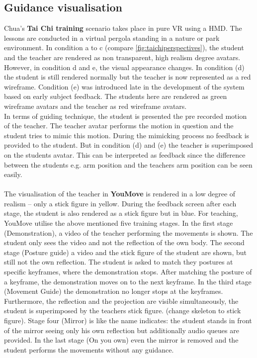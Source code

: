 \subsection{Guidance visualisation}
Chua's \textbf{Tai Chi training} scenario takes place in pure VR using a HMD. The lessons are conducted in a virtual pergola standing in a nature or park environment. In condition a to c (compare \ref{fig:taichiperspectives}), the student and the teacher are rendered as non transparent, high realism degree avatars. However, in condition d and e, the visual appearance changes. In condition (d) the student is still rendered normally but the teacher is now represented as a red wireframe. Condition (e) was introduced late in the development of the system based on early subject feedback. The students here are rendered as green wireframe avatars and the teacher as red wireframe avatars.\\
In terms of guiding technique, the student is presented the pre recorded motion of the teacher. The teacher avatar performs the motion in question and the student tries to mimic this motion. During the mimicking process no feedback is provided to the student. But in condition (d) and (e) the teacher is superimposed on the students avatar. This can be interpreted as feedback since the difference between the students e.g. arm position and the teachers arm position can be seen easily.\\ \\
The visualisation of the teacher in \textbf{YouMove} is rendered in a low degree of realism \--- only a stick figure in yellow. During the feedback screen after each stage, the student is also rendered as a stick figure but in blue. For teaching, YouMove utilise the above mentioned five training stages. In the first stage (Demonstration), a video of the teacher performing the movements is shown. The student only sees the video and not the reflection of the own body. The second stage (Posture guide) a video and the stick figure of the student are shown, but still not the own reflection. The student is asked to match they postures at specific keyframes, where the demonstration stops. After matching the posture of a keyframe, the demonstration moves on to the next keyframe. In the third stage (Movement Guide) the demonstration no longer stops at the keyframes. Furthermore, the reflection and the projection are visible simultaneously, the student is superimposed by the teachers stick figure. (\todo change skeleton to stick figure). Stage four (Mirror) is like the name indicates: the student stands in front of the mirror seeing only his own reflection but additionally audio queues are provided. In the last stage (On you own) even the mirror is removed and the student performs the movements without any guidance.\\
